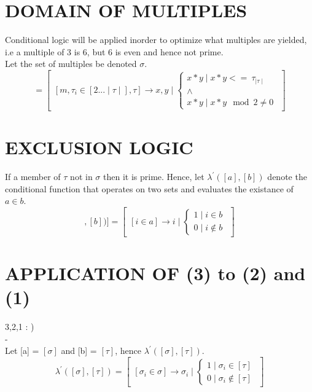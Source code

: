\documentclass[11pt]{article}
\begin{document}
\section{DOMAIN OF MULTIPLES}
Conditional logic will be applied inorder to optimize what multiples are yielded, i.e a multiple of 3 is 6, but 6 is even and hence not
prime.\\
Let the set of multiples be denoted $\sigma$.
\begin{equation}[\sigma]=\begin{bmatrix} [m,\tau_i \in [2...\mid\tau\mid],\tau]\rightarrow x,y \mid
\begin{cases}x*y\mid x*y <= \ \tau_{\mid\tau\mid}\\ \land\\x*y\mid x*y \mod 2 \not = 0\end{cases}\end{bmatrix}
\end{equation}
\section{EXCLUSION LOGIC}
If a member of $\tau$ not in $\sigma$ then it is prime.
Hence, let $\lambda^\prime([a],[b])$ denote the conditional function that operates on two sets and evaluates the existance of $a\in b$.
\begin{equation}[\lambda^\prime([a],[b])] =\begin{bmatrix} [i \in a]\rightarrow i\mid \begin{cases}1 \mid i \in b\\ 0 \mid i 
\not\in b\end{cases}\end{bmatrix}\end{equation}

\section{APPLICATION OF (3) to (2) and (1)}
{\color{red}3,2,1 : )}\\
{\color{white}-}
\\
Let [a] = $[\sigma]$ and [b] = $[\tau]$, hence $\lambda^\prime([\sigma],[\tau])$.
\begin{equation} \lambda^\prime([\sigma],[\tau])= \begin{bmatrix}[\sigma_i\in\sigma]\rightarrow\sigma_i\mid
	\begin{cases}1 \mid \sigma_i \in [\tau]\\ 0 \mid \sigma_i \not\in [\tau]\end{cases}\end{bmatrix} \end{equation}
\end{document}
